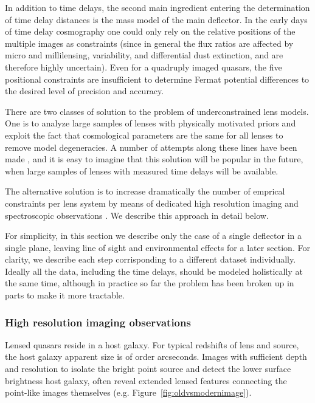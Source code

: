 In addition to time delays, the second main ingredient entering the
determination of time delay distances is the mass model of the main
deflector. In the early days of time delay cosmography one could only
rely on the relative positions of the multiple images as constraints
(since in general the flux ratios are affected by micro and
millilensing, variability, and differential dust extinction, and are
therefore highly uncertain). Even for a quadruply imaged quasars, the
five positional constraints are insufficient to determine Fermat
potential differences to the desired level of precision and accuracy.

There are two classes of solution to the problem of underconstrained
lens models. One is to analyze large samples of lenses with physically
motivated priors and exploit the fact that cosmological parameters are
the same for all lenses to remove model degeneracies. A number of
attempts along these lines have been made \citep{Ogu07b,RK++2015}, and
it is easy to imagine that this solution will be popular in the
future, when large samples of lenses with measured time delays will be
available.

The alternative solution is to increase dramatically the number of
emprical constraints per lens system by means of dedicated high
resolution imaging and spectroscopic observations
\citep{Suy++10,Suy++13,Suy++14}. We describe this approach in detail
below.

For simplicity, in this section we describe only the case of a single
deflector in a single plane, leaving line of sight and environmental
effects for a later section. For clarity, we describe each step
corrisponding to a different dataset individually. Ideally all the
data, including the time delays, should be modeled holistically at the
same time, although in practice so far the problem has been broken up
in parts to make it more tractable.


\subsubsection{High resolution imaging observations}

Lensed quasars reside in a host galaxy. For typical redshifts of lens
and source, the host galaxy apparent size is of order
arcseconds. Images with sufficient depth and resolution to isolate the
bright point source and detect the lower surface brightness host
galaxy, often reveal extended lensed features connecting the
point-like images themselves (e.g. Figure~\ref{fig:oldvsmodernimage}).

